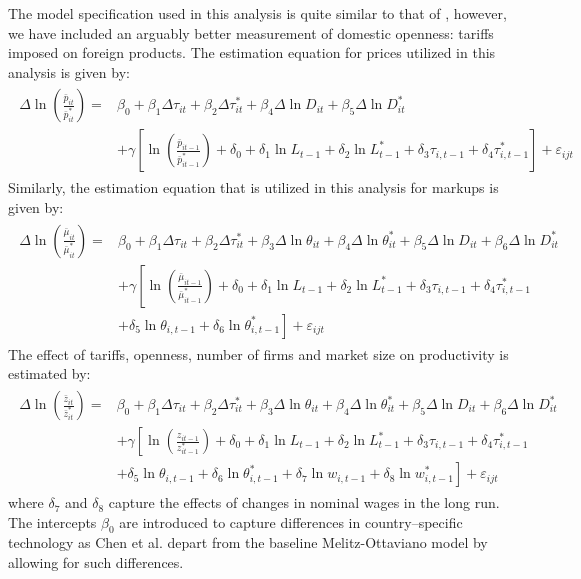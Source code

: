 \documentclass[a4paper,12pt]{article}
\begin{document}
The model specification used in this analysis is quite similar to that of \citet{Chen2009}, however, we have included an arguably better measurement of domestic openness: tariffs imposed on foreign products. The estimation equation for prices utilized in this analysis is given by: 
\begin{align}
\begin{split}\label{eq:gw-estimation-prices}
\Delta \ln \left( \frac{\bar{p}_{it}}{\bar{p}_{it}^*} \right) = &\beta_0 + \beta_1 \Delta \tau_{it} + \beta_2 \Delta \tau_{it}^* + \beta_4 \Delta \ln D_{it} + \beta_5 \Delta \ln D_{it}^* \\ 
&+ \gamma \left[ \ln \left( \frac{\bar{p}_{it-1}}{\bar{p}_{it-1}^*} \right) + \delta_0 + \delta_1 \ln L_{t-1} + \delta_2\ln L_{t-1}^* + \delta_3  \tau_{i,t-1} + \delta_4  \tau_{i,t-1}^* \right] + \varepsilon_{ijt} 
\end{split}
\end{align}
Similarly, the estimation equation that is utilized in this analysis for markups is given by:
\begin{align}
\begin{split}\label{eq:gw-estimation-markup}
\Delta \ln \left( \frac{\bar{\mu}_{it}}{\bar{\mu}_{it}^*} \right) = &\beta_0 + \beta_1 \Delta \tau_{it} + \beta_2 \Delta \tau_{it}^* + \beta_3 \Delta \ln \theta_{it} + \beta_4 \Delta \ln \theta_{it}^* + \beta_5 \Delta \ln D_{it} + \beta_6 \Delta \ln D_{it}^*\\ 
&+ \gamma \left[ \ln \left( \frac{\bar{\mu}_{it-1}}{\bar{\mu}_{it-1}^*} \right) + \delta_0 + \delta_1 \ln L_{t-1} + \delta_2\ln L_{t-1}^* + \delta_3  \tau_{i,t-1} + \delta_4  \tau_{i,t-1}^* \right. \\
&+ \delta_5 \ln  \theta_{i,t-1} +  \left. \delta_6 \ln  \theta_{i,t-1}^* \right] + \varepsilon_{ijt} 
\end{split}
\end{align}
The effect of tariffs, openness, number of firms and market size on productivity is estimated by:
\begin{align}
\begin{split}\label{eq:gw-estimation-productivity}
\Delta \ln \left( \frac{\bar{z}_{it}}{\bar{z}_{it}^*} \right) =&\beta_0 + \beta_1 \Delta \tau_{it} + \beta_2 \Delta \tau_{it}^* + \beta_3 \Delta \ln \theta_{it} + \beta_4 \Delta \ln \theta_{it}^* + \beta_5 \Delta \ln D_{it} + \beta_6 \Delta \ln D_{it}^*\\
&+ \gamma \left[ \ln \left( \frac{z_{it-1}}{z_{it-1}^*} \right) + \delta_0 + \delta_1 \ln L_{t-1} + \delta_2\ln L_{t-1}^* + \delta_3  \tau_{i,t-1} + \delta_4  \tau_{i,t-1}^*  \right. \\ 
&+ \delta_5 \ln  \theta_{i,t-1}+ \left. \delta_6 \ln  \theta_{i,t-1}^* + \delta_7 \ln w_{i,t-1} +  \delta_8 \ln w_{i,t-1}^* \right] + \varepsilon_{ijt} 
\end{split}
\end{align}
where $\delta_7$ and $\delta_8$ capture the effects of changes in nominal wages in the long run. The intercepts $\beta_0$ are introduced to capture differences in country--specific technology as Chen et al. depart from the baseline Melitz-Ottaviano model by allowing for such differences.
\end{document}
